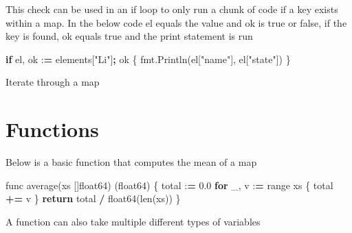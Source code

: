 \documentclass[]{book}
\newenvironment{Shaded}{\begin{snugshade}}{\end{snugshade}}
\newcommand{\FloatTok}[1]{\textcolor[rgb]{0.00,0.00,0.81}{#1}}
\newcommand{\CharTok}[1]{\textcolor[rgb]{0.31,0.60,0.02}{#1}}
\newcommand{\SpecialCharTok}[1]{\textcolor[rgb]{0.00,0.00,0.00}{#1}}
\newcommand{\StringTok}[1]{\textcolor[rgb]{0.31,0.60,0.02}{#1}}
\newcommand{\ControlFlowTok}[1]{\textcolor[rgb]{0.13,0.29,0.53}{\textbf{#1}}}
\newcommand{\OperatorTok}[1]{\textcolor[rgb]{0.81,0.36,0.00}{\textbf{#1}}}
\newcommand{\BuiltInTok}[1]{#1}
\newcommand{\NormalTok}[1]{#1}
\begin{document}
This check can be used in an if loop to only run a chunk of code if a
key exists within a map. In the below code el equals the value and ok is
true or false, if the key is found, ok equals true and the print
statement is run

\begin{Shaded}
\begin{Highlighting}[]
\ControlFlowTok{if}\NormalTok{ el, ok :}\OperatorTok{=}\NormalTok{ elements[}\StringTok{"Li"}\NormalTok{]}\OperatorTok{;}\NormalTok{ ok \{}
\NormalTok{fmt.Println(el[}\StringTok{"name"}\NormalTok{], el[}\StringTok{"state"}\NormalTok{])}
\NormalTok{\}}
\end{Highlighting}
\end{Shaded}

Iterate through a map

\begin{Shaded}
\end{Shaded}

\section{Functions}\label{functions}

Below is a basic function that computes the mean of a map

\begin{Shaded}
\begin{Highlighting}[]
\NormalTok{func average(xs []float64) (float64) \{}
\NormalTok{    total :}\OperatorTok{=} \FloatTok{0.0}                      
    \ControlFlowTok{for}\NormalTok{ _, v :}\OperatorTok{=} \BuiltInTok{range}\NormalTok{ xs \{            }
\NormalTok{        total }\OperatorTok{+=}\NormalTok{ v                    }
\NormalTok{    \}}
    \ControlFlowTok{return}\NormalTok{ total }\OperatorTok{/}\NormalTok{ float64(}\BuiltInTok{len}\NormalTok{(xs))   }
\NormalTok{\}                                     }
\end{Highlighting}
\end{Shaded}

A function can also take multiple different types of variables
\end{document}
